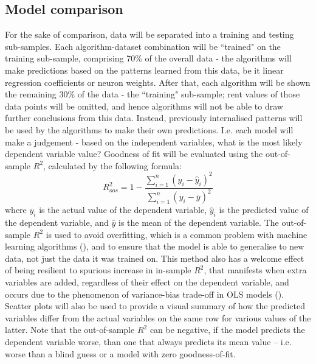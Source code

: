 \documentclass[12pt]{report}
\begin{document}
\subsection{Model comparison}
For the sake of comparison, data will be separated into a training and testing sub-samples. Each algorithm-dataset combination will be ``trained" on the training sub-sample, comprising 70\% of the overall data - the algorithms will make predictions based on the patterns learned from this data, be it linear regression coefficients or neuron weights. After that, each algorithm will be shown the remaining 30\% of the data - the ``training" sub-sample; rent values of those data points will be omitted, and hence algorithms will not be able to draw further conclusions from this data. Instead, previously internalised patterns will be used by the algorithms to make their own predictions. I.e. each model will make a judgement - based on the independent variables, what is the most likely dependent variable value? Goodness of fit will be evaluated using the out-of-sample $R^2$, calculated by the following formula:
\begin{equation}
	R^2_{oos} = 1 - \frac{\sum_{i=1}^{n}(y_i - \hat{y}_i)^2}{\sum_{i=1}^{n}(y_i - \bar{y})^2}
\end{equation}
where $y_i$ is the actual value of the dependent variable, $\hat{y}_i$ is the predicted value of the dependent variable, and $\bar{y}$ is the mean of the dependent variable. The out-of-sample $R^2$ is used to avoid overfitting, which is a common problem with machine learning algorithms (\cite[p. 2]{hawinkel2023}), and to ensure that the model is able to generalise to new data, not just the data it was trained on. This method also has a welcome effect of being resilient to spurious increase in in-sample $R^2$, that manifests when extra variables are added, regardless of their effect on the dependent variable, and occurs due to the phenomenon of variance-bias trade-off in OLS models (\cite{dalpiaz2021}). Scatter plots will also be used to provide a visual summary of how the predicted variables differ from the actual variables on the same row for various values of the latter. Note that the out-of-sample $R^2$ can be negative, if the model predicts the dependent variable worse, than one that always predicts its mean value -- i.e. worse than a blind guess or a model with zero goodness-of-fit.
\end{document}

